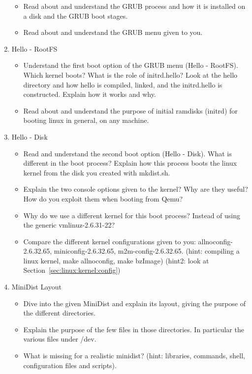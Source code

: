 \documentclass[10]{article}
\begin{document}
\begin{enumerate}
\begin{itemize}
 
\item Read about and understand the GRUB process and how it is
installed on a disk and the GRUB boot stages.
\item Read about and understand the GRUB menu given to you.
\end{itemize}

\item Hello - RootFS
\begin{itemize}
\item Understand the first boot option of the GRUB menu (Hello - RootFS).
Which kernel boots? What is the role of initrd.hello? Look at the
hello directory and how hello is compiled, linked, and the initrd.hello
is constructed. Explain how it works and why.
\item Read about and understand the purpose of initial ramdisks (initrd)
for booting linux in general, on any machine.
\end{itemize}

\item Hello - Disk
\begin{itemize}
\item Read and understand the second boot option (Hello - Disk).
What is different in the boot process? Explain how this process
boots the linux kernel from the disk you created with mkdist.sh.
\item Explain the two console options given to the kernel?
Why are they useful? How do you exploit them when booting from Qemu?
\item Why do we use a different kernel for this boot process?
Instead of using the generic vmlinuz-2.6.31-22?
\item Compare the different kernel configurations given to you:
allnoconfig-2.6.32.65, miniconfig-2.6.32.65, m2m-config-2.6.32.65.
(hint: compiling a linux kernel, make allnoconfig, make bzImage)
(hint2: look at Section~\ref{sec:linux:kernel:config})

\end{itemize}

\item MiniDist Layout
\begin{itemize}
\item Dive into the given MiniDist and explain its layout,
giving the purpose of the different directories.
\item Explain the purpose of the few files in those directories.
In particular the various files under /dev.
\item What is missing for a realistic minidist?
(hint: libraries, commands, shell, configuration files and scripts).
\end{itemize}

\end{enumerate}
\end{document}
